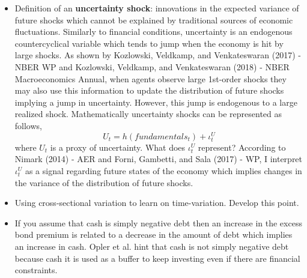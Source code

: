 \documentclass{article}
\begin{document}
{\begin{itemize}
	\item Definition of an \textbf{uncertainty shock}: innovations in the expected variance of future shocks which cannot be explained by traditional sources of economic fluctuations. Similarly to financial conditions, uncertainty is an endogenous countercyclical variable which tends to jump when the economy is hit by large shocks. As shown by Kozlowski, Veldkamp, and Venkateswaran (2017) - NBER WP and Kozlowski, Veldkamp, and Venkateswaran (2018) - NBER Macroeconomics Annual, when agents observe large 1st-order shocks they may also use this information to update the distribution of future shocks implying a jump in uncertainty. However, this jump is endogenous to a large realized shock. Mathematically uncertainty shocks can be represented as follows,
	$$
	U_t = h(fundamentals_t) + \iota_t^U
	$$
	where $U_t$ is a proxy of uncertainty. What does $\iota_t^U$ represent? According to Nimark (2014) - AER and Forni, Gambetti, and Sala (2017) - WP, I interpret $\iota_t^U$ as a signal regarding future states of the economy which implies changes in the variance of the distribution of future shocks.
	\item Using cross-sectional variation to learn on time-variation. Develop this point. 
	\item If you assume that cash is simply negative debt then an increase in the excess bond premium is related to a decrease in the amount of debt which implies an increase in cash. Opler et al. hint that cash is not simply negative debt because cash it is used as a buffer to keep investing even if there are financial constraints.
\end{itemize}


}
\end{document}
